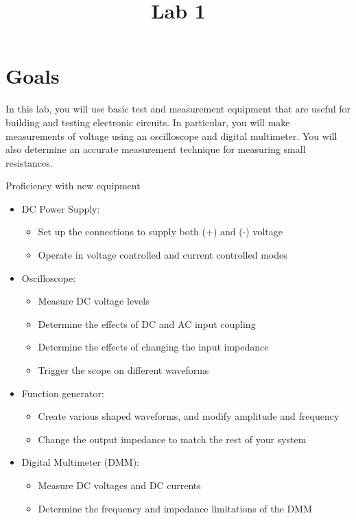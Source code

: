 \documentclass[
]{article}
\title{Lab 1}
\author{}
\date{}
\begin{document}
\maketitle

\hypertarget{goals}{%
\section{Goals}\label{goals}}

In this lab, you will use basic test and measurement equipment that are
useful for building and testing electronic circuits. In particular, you
will make measurements of voltage using an oscilloscope and digital
multimeter. You will also determine an accurate measurement technique
for measuring small resistances.

Proficiency with new equipment

\begin{itemize}
\item
  DC Power Supply:

  \begin{itemize}
  \item
    Set up the connections to supply both (+) and (-) voltage
  \item
    Operate in voltage controlled and current controlled modes
  \end{itemize}
\item
  Oscilloscope:

  \begin{itemize}
  \item
    Measure DC voltage levels
  \item
    Determine the effects of DC and AC input coupling
  \item
    Determine the effects of changing the input impedance
  \item
    Trigger the scope on different waveforms
  \end{itemize}
\item
  Function generator:

  \begin{itemize}
  \item
    Create various shaped waveforms, and modify amplitude and frequency
  \item
    Change the output impedance to match the rest of your system
  \end{itemize}
\item
  Digital Multimeter (DMM):

  \begin{itemize}
  \item
    Measure DC voltages and DC currents
  \item
    Determine the frequency and impedance limitations of the DMM
  \end{itemize}
\end{itemize}
\end{document}
